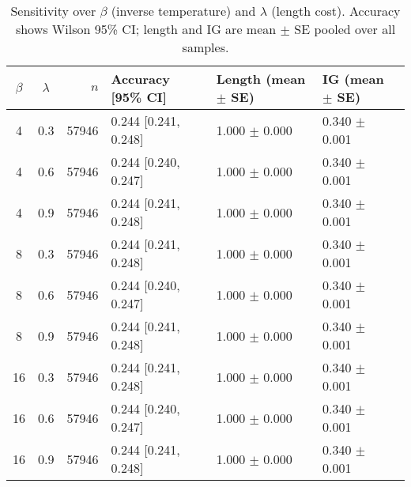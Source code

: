 \begin{table}[!htbp]
\centering
\small
\caption{Sensitivity over $\beta$ (inverse temperature) and $\lambda$ (length cost). Accuracy shows Wilson 95\% CI; length and IG are mean $\pm$ SE pooled over all samples.}
\label{tab:sensitivity}
\begin{tabular}{ccrlll}
\toprule
$\beta$ & $\lambda$ & $n$ & Accuracy [95\% CI] & Length (mean $\pm$ SE) & IG (mean $\pm$ SE) \\
\midrule
4 & 0.3 & 57946 & 0.244 [0.241, 0.248] & 1.000 $\pm$ 0.000 & 0.340 $\pm$ 0.001 \\
4 & 0.6 & 57946 & 0.244 [0.240, 0.247] & 1.000 $\pm$ 0.000 & 0.340 $\pm$ 0.001 \\
4 & 0.9 & 57946 & 0.244 [0.241, 0.248] & 1.000 $\pm$ 0.000 & 0.340 $\pm$ 0.001 \\
8 & 0.3 & 57946 & 0.244 [0.241, 0.248] & 1.000 $\pm$ 0.000 & 0.340 $\pm$ 0.001 \\
8 & 0.6 & 57946 & 0.244 [0.240, 0.247] & 1.000 $\pm$ 0.000 & 0.340 $\pm$ 0.001 \\
8 & 0.9 & 57946 & 0.244 [0.241, 0.248] & 1.000 $\pm$ 0.000 & 0.340 $\pm$ 0.001 \\
16 & 0.3 & 57946 & 0.244 [0.241, 0.248] & 1.000 $\pm$ 0.000 & 0.340 $\pm$ 0.001 \\
16 & 0.6 & 57946 & 0.244 [0.240, 0.247] & 1.000 $\pm$ 0.000 & 0.340 $\pm$ 0.001 \\
16 & 0.9 & 57946 & 0.244 [0.241, 0.248] & 1.000 $\pm$ 0.000 & 0.340 $\pm$ 0.001 \\
\bottomrule
\end{tabular}
\end{table}